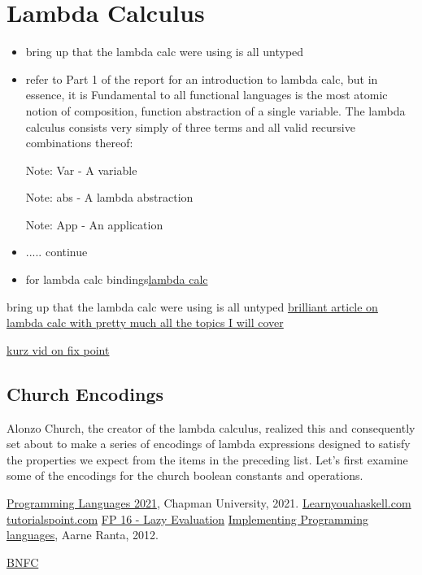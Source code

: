 \documentclass{article}
\begin{document}
\section{Lambda Calculus}
\begin{itemize}
    \item bring up that the lambda calc were using is all untyped
    \item refer to Part 1 of the report for an introduction to lambda calc, but in essence, it is Fundamental to all functional languages is the most atomic notion of composition, function abstraction of a single variable. The lambda calculus consists very simply of three terms and all valid recursive combinations thereof: 
    \item[Note:] Var - A variable
    \item[Note:] abs - A lambda abstraction
    \item[Note:] App - An application
    \item ..... continue
    \item for lambda calc bindings\href{http://dev.stephendiehl.com/fun/lambda_calculus.html}{lambda calc}

\end{itemize}
bring up that the lambda calc were using is all untyped
\href{https://brilliant.org/wiki/lambda-calculus/}{brilliant article on lambda calc with pretty much all the topics I will cover}

\href{https://www.youtube.com/watch?v=XvDOwbSh3xE}{kurz vid on fix point}

\subsection{Church Encodings}
Alonzo Church, the creator of the lambda calculus, realized this and consequently set about to make a series of encodings of lambda expressions designed to satisfy the properties we expect from the items in the preceding list. Let's first examine some of the encodings for the church boolean constants and operations.
\begin{thebibliography}{99}
 \href{https://github.com/alexhkurz/programming-languages-2021/blob/main/README.md}{Programming Languages 2021}, Chapman University, 2021.
 \href{http://learnyouahaskell.com/chapters}{Learnyouahaskell.com}
 \href{https://www.tutorialspoint.com/haskell/haskell_types_and_type_class.htm}{tutorialspoint.com}
 \href{https://www.youtube.com/watch?v=R1uBhRK2AKI}{FP 16 - Lazy Evaluation}
 \href{http://www.grammaticalframework.org/ipl-book/}{Implementing Programming languages}, Aarne Ranta, 2012.

 \href{https://bnfc.readthedocs.io/en/latest/lbnf.html} {BNFC}
\end{thebibliography}
\end{document}
